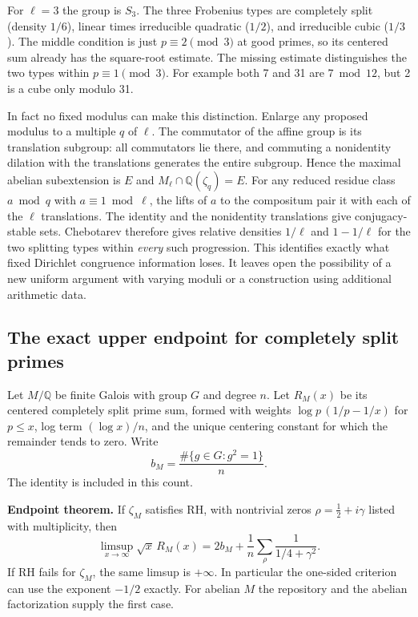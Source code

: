 \documentclass[11pt]{article}
\newcommand{\Q}{\mathbb Q}\newcommand{\R}{\mathbb R}
\begin{document}
For $\ell=3$ the group is $S_3$. The three Frobenius types are completely split (density $1/6$), linear times irreducible quadratic ($1/2$), and irreducible cubic ($1/3$). The middle condition is just $p\equiv2\pmod3$ at good primes, so its centered sum already has the square-root estimate. The missing estimate distinguishes the two types within $p\equiv1\pmod3$. For example both 7 and 31 are $7\bmod12$, but 2 is a cube only modulo 31.

In fact no fixed modulus can make this distinction. Enlarge any proposed modulus to a multiple $q$ of $\ell$. The commutator of the affine group is its translation subgroup: all commutators lie there, and commuting a nonidentity dilation with the translations generates the entire subgroup. Hence the maximal abelian subextension is $E$ and $M_\ell\cap\Q(\zeta_q)=E$. For any reduced residue class $a\bmod q$ with $a\equiv1\bmod\ell$, the lifts of $a$ to the compositum pair it with each of the $\ell$ translations. The identity and the nonidentity translations give conjugacy-stable sets. Chebotarev therefore gives relative densities $1/\ell$ and $1-1/\ell$ for the two splitting types within \emph{every} such progression. This identifies exactly what fixed Dirichlet congruence information loses. It leaves open the possibility of a new uniform argument with varying moduli or a construction using additional arithmetic data.



\subsection*{The exact upper endpoint for completely split primes}
Let $M/\mathbb Q$ be finite Galois with group $G$ and degree $n$.
Let $R_M(x)$ be its centered completely split prime sum, formed with weights
$\log p\,(1/p-1/x)$ for $p\le x$, log term $(\log x)/n$, and the unique
centering constant for which the remainder tends to zero. Write
\[
 b_M=\frac{\#\{g\in G:g^2=1\}}{n}.
\]
The identity is included in this count.

\noindent\textbf{Endpoint theorem.}
If $\zeta_M$ satisfies RH, with nontrivial zeros $\rho=\frac12+i\gamma$
listed with multiplicity, then
\[
 \limsup_{x\to\infty}\sqrt{x}\,R_M(x)
 =2b_M+\frac1n\sum_{\rho}\frac{1}{1/4+\gamma^2}.
\]
If RH fails for $\zeta_M$, the same limsup is $+\infty$. In particular the
one-sided criterion can use the exponent $-1/2$ exactly. For abelian $M$
the repository and the abelian factorization supply the first case.
\end{document}

